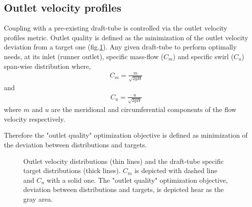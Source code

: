 \subsection{Outlet velocity profiles}
Coupling with a pre-existing draft-tube is controlled via the outlet velocity profiles metric. Outlet quality is defined as the minimization of the outlet velocity deviation from a target one (fig.\ref{design-obj2}). Any given draft-tube to perform optimally needs, at its inlet (runner outlet), specific mass-flow ($C_m$) and  specific swirl ($C_u$) span-wise distribution where, 
\begin{eqnarray}
		C_m=\frac{m}{\sqrt{2gH}}
\label{Cavi4}
\end{eqnarray}
and 
\begin{eqnarray}
		C_u=\frac{u}{\sqrt{2gH}}
\label{Cavi4}
\end{eqnarray}
where $m$ and $u$ are the meridional and circumferential components of the flow velocity respectively.

Therefore the  "outlet quality" optimization objective is defined as minimization of the deviation between distributions and targets. 

\begin{figure}[h!]
\begin{minipage}[b]{1\linewidth}
 \centering
\end{minipage}
\caption{Outlet velocity distributions (thin lines) and the draft-tube specific target distributions (thick lines). $C_m$ is depicted with dashed line and $C_u$ with a solid one. The "outlet quality" optimization objective, deviation between distributions and targets, is depicted hear as the gray area.}
\label{design-obj2}
\end{figure}

